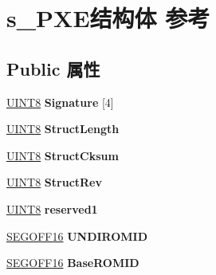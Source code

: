 \hypertarget{structs___p_x_e}{}\section{s\+\_\+\+P\+X\+E结构体 参考}
\label{structs___p_x_e}
\subsection*{Public 属性}
\begin{DoxyCompactItemize}
\item 
\mbox{\label{structs___p_x_e_aea2d9c74fc0f5bc7e3641c52e2c90e1e}} 
\hyperlink{_processor_bind_8h_ab27e9918b538ce9d8ca692479b375b6a}{U\+I\+N\+T8} {\bfseries Signature} \mbox{[}4\mbox{]}
\item 
\mbox{\label{structs___p_x_e_a175a0f3f73b485e752fc69b8cce8a637}} 
\hyperlink{_processor_bind_8h_ab27e9918b538ce9d8ca692479b375b6a}{U\+I\+N\+T8} {\bfseries Struct\+Length}
\item 
\mbox{\label{structs___p_x_e_a8af8f6ded0726644b987bffe57274078}} 
\hyperlink{_processor_bind_8h_ab27e9918b538ce9d8ca692479b375b6a}{U\+I\+N\+T8} {\bfseries Struct\+Cksum}
\item 
\mbox{\label{structs___p_x_e_ac8449243bf3f0685093b17a3a9c20523}} 
\hyperlink{_processor_bind_8h_ab27e9918b538ce9d8ca692479b375b6a}{U\+I\+N\+T8} {\bfseries Struct\+Rev}
\item 
\mbox{\label{structs___p_x_e_ac45ce54732dc0484fef6ef87e9964625}} 
\hyperlink{_processor_bind_8h_ab27e9918b538ce9d8ca692479b375b6a}{U\+I\+N\+T8} {\bfseries reserved1}
\item 
\mbox{\label{structs___p_x_e_a65edb70b9c574217961d6c3bc8ee0315}} 
\hyperlink{structs___s_e_g_o_f_f16}{S\+E\+G\+O\+F\+F16} {\bfseries U\+N\+D\+I\+R\+O\+M\+ID}
\item 
\mbox{\label{structs___p_x_e_a306865d03d55c54043f6ee2cca919d61}} 
\hyperlink{structs___s_e_g_o_f_f16}{S\+E\+G\+O\+F\+F16} {\bfseries Base\+R\+O\+M\+ID}
\item 
\mbox{\label{structs___p_x_e_a7e2a5b5a9058731eaf43fd35b473641f}} 

\end{DoxyCompactItemize}
